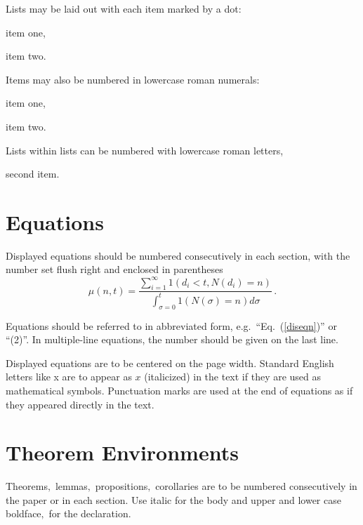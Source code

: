 \documentclass{ws-ijmpa}
\begin{document}
Lists may be laid out with each item marked by a dot:
\begin{itemlist}
 \item item one,
 \item item two.
\end{itemlist}
Items may also be numbered in lowercase roman numerals:
\begin{romanlist}[(ii)]
\item item one,
\item item two.
	\begin{romanlist}[(b)]
	\item Lists within lists can be numbered with lowercase
              roman letters,
	\item second item.
	\end{romanlist}
\end{romanlist}

\section{Equations}

Displayed equations should be numbered consecutively in each
section, with the number set flush right and enclosed in
parentheses
\begin{equation}
\mu(n, t) = \frac{\sum^\infty_{i=1} 1(d_i < t, N(d_i)
= n)}{\int^t_{\sigma=0} 1(N(\sigma) = n)d\sigma}\,.
\label{diseqn}
\end{equation}

Equations should be referred to in abbreviated form,
e.g.~``Eq.~(\ref{diseqn})'' or ``(2)''. In multiple-line
equations, the number should be given on the last line.

Displayed equations are to be centered on the page width.
Standard English letters like x are to appear as $x$
(italicized) in the text if they are used as mathematical
symbols. Punctuation marks are used at the end of equations as
if they appeared directly in the text.

\section{Theorem Environments}

\begin{theorem}
Theorems$,$ lemmas$,$ propositions$,$ corollaries are to be numbered
consecutively in the paper or in each section. Use italic for the
body and upper and lower case boldface$,$ for the declaration.
\end{theorem}
\end{document}
